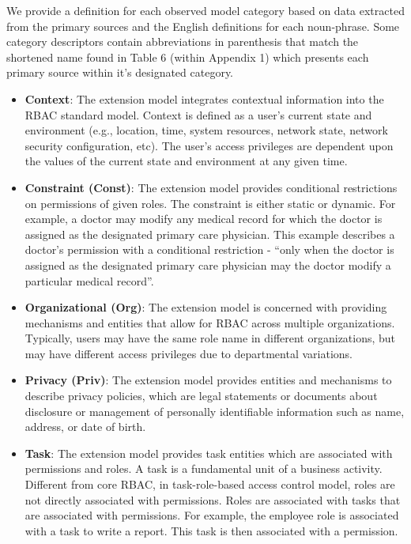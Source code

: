 We provide a definition for each observed model category based on data extracted from the primary sources and the English definitions for each noun-phrase.
Some category descriptors contain abbreviations in parenthesis that match the shortened name found in Table 6 (within Appendix 1) which presents each primary source within it's designated category.

\begin{itemize}

  \item \textbf{Context}: The extension model integrates contextual information into the RBAC standard model. Context is defined as a user's current state and environment (e.g., location, time, system resources, network state, network security configuration, etc). The user's access privileges are dependent upon the values of the current state and environment at any given time.

  \item \textbf{Constraint (Const)}: The extension model provides conditional restrictions on permissions of given roles. The constraint is either static or dynamic. For example, a doctor may modify any medical record for which the doctor is assigned as the designated primary care physician. This example describes a doctor's permission with a conditional restriction - ``only when the doctor is assigned as the designated primary care physician may the doctor modify a particular medical record''.

  \item \textbf{Organizational (Org)}: The extension model is concerned with providing mechanisms and entities that allow for RBAC across multiple organizations. Typically, users may have the same role name in different organizations, but may have different access privileges due to departmental variations.
  
  \item \textbf{Privacy (Priv)}: The extension model provides entities and mechanisms to describe privacy policies, which are legal statements or documents about disclosure or management of personally identifiable information such as name, address, or date of birth.
  
  \item \textbf{Task}: The extension model provides task entities which are associated with permissions and roles. A task is a fundamental unit of a business activity. Different from core RBAC, in task-role-based access control model, roles are not directly associated with permissions. Roles are associated with tasks that are associated with permissions. For example, the employee role is associated with a task to write a report. This task is then associated with a permission.


\end{itemize}
